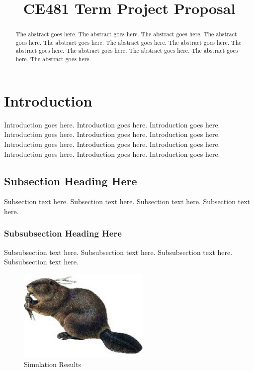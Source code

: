 \documentclass[conference,onecolumn]{IEEEtran} %
\begin{document}
%
\title{CE481 Term Project Proposal}


\author{
\and
{}
}


\maketitle


\begin{abstract}
The abstract goes here. The abstract goes here. The abstract goes here. The abstract goes here.
The abstract goes here. The abstract goes here. The abstract goes here. The abstract goes here.
The abstract goes here. The abstract goes here. The abstract goes here. The abstract goes here.
\end{abstract}


\section{Introduction}
Introduction goes here. Introduction goes here. Introduction goes here. Introduction goes here.
Introduction goes here. Introduction goes here. Introduction goes here. Introduction goes here.
Introduction goes here. Introduction goes here. Introduction goes here. Introduction goes here.

\subsection{Subsection Heading Here}
Subsection text here. Subsection text here. Subsection text here. Subsection text here.


\subsubsection{Subsubsection Heading Here}
Subsubsection text here. Subsubsection text here. Subsubsection text here. Subsubsection text here.

\begin{figure}[!h]
  \centering
    \includegraphics[width=2.5in]{beaver.jpg}
  \caption{Simulation Results}
  \label{figlabel}
\end{figure}
\end{document}
